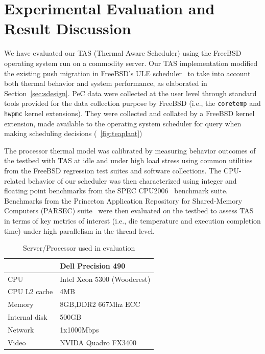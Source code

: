 \documentclass[times, 10pt,twocolumn]{IEEEtran}
\begin{document}
\section{Experimental Evaluation and Result Discussion}
\label{sec:experiment} 
We have evaluated our TAS (Thermal Aware Scheduler) using
the FreeBSD operating system run on a commodity server.
Our TAS implementation modified the existing 
push migration in FreeBSD's ULE scheduler~\cite{Roberson2003} to take
into account both thermal behavior and system performance,
as elaborated in Section~\ref{sec:sdesign}. 
PeC data were collected at the user level through standard tools 
provided for the data collection purpose by FreeBSD
(i.e., the \texttt{coretemp} and \texttt{hwpmc} kernel extensions).  
They were collected and collated by a FreeBSD kernel extension,
made available to the operating system scheduler for query when making
scheduling decisions (\figurename~\ref{fig:teaplant})

The processor thermal model was calibrated by measuring behavior outcomes
of the testbed with TAS at idle and under high load stress using common
utilities from the FreeBSD regression test suites and software collections. 
The CPU-related behavior of our scheduler was then characterized using
integer and floating point benchmarks from the SPEC
CPU2006~\cite{Henning2006} benchmark suite.
Benchmarks from the Princeton Application Repository for Shared-Memory Computers
(PARSEC) suite~\cite{Bienia2008} were then evaluated on the testbed
to assess TAS in terms of key metrics of interest (i.e., die temperature
and execution completion time) under high parallelism in the thread level.

\begin{table}[tbhp] \centering
  \caption{Server/Processor used in evaluation}
  \label{tab:hardware}
  \begin{tabular}{l l} 
\hline 
&\textbf{Dell Precision 490}\\ 
\hline
\hline 
CPU&Intel Xeon 5300 (Woodcrest)\\ 
CPU L2 cache&4MB\\ 
Memory&8GB,DDR2 667Mhz ECC\\
Internal disk&500GB\\ 
Network&1x1000Mbps\\ 
Video&NVIDA Quadro FX3400\\ 
\hline
  \end{tabular}
\end{table}
\end{document}
